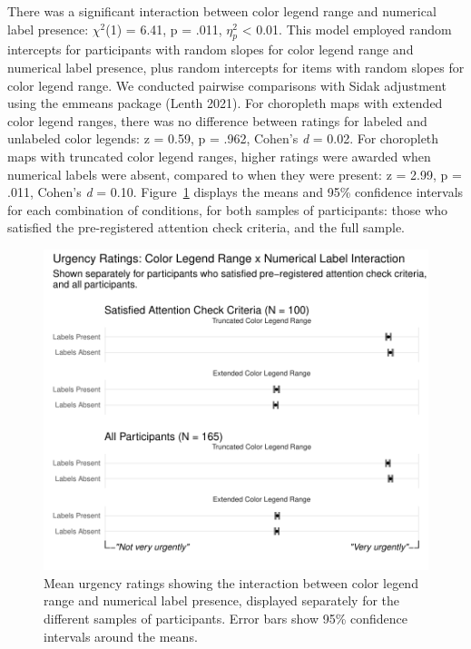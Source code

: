 \documentclass[
]{interact}
\begin{document}
There was a significant interaction between color legend range and
numerical label presence: \(\chi^2\)(1) = 6.41, p = .011, \(\eta_p^2\)
\textless{} 0.01. This model employed random intercepts for participants
with random slopes for color legend range and numerical label presence,
plus random intercepts for items with random slopes for color legend
range. We conducted pairwise comparisons with Sidak adjustment using the
emmeans package (Lenth 2021). For choropleth maps with extended color
legend ranges, there was no difference between ratings for labeled and
unlabeled color legends: z = 0.59, p = .962, Cohen's \emph{d} = 0.02.
For choropleth maps with truncated color legend ranges, higher ratings
were awarded when numerical labels were absent, compared to when they
were present: z = 2.99, p = .011, Cohen's \emph{d} = 0.10.
Figure~\ref{fig-interaction-chart} displays the means and 95\%
confidence intervals for each combination of conditions, for both
samples of participants: those who satisfied the pre-registered
attention check criteria, and the full sample.

\begin{figure}

{\centering \includegraphics{ChoroplethMagnitude_files/figure-pdf/fig-interaction-chart-1.pdf}

}

\caption{\label{fig-interaction-chart}Mean urgency ratings showing the
interaction between color legend range and numerical label presence,
displayed separately for the different samples of participants. Error
bars show 95\% confidence intervals around the means.}

\end{figure}
\end{document}
